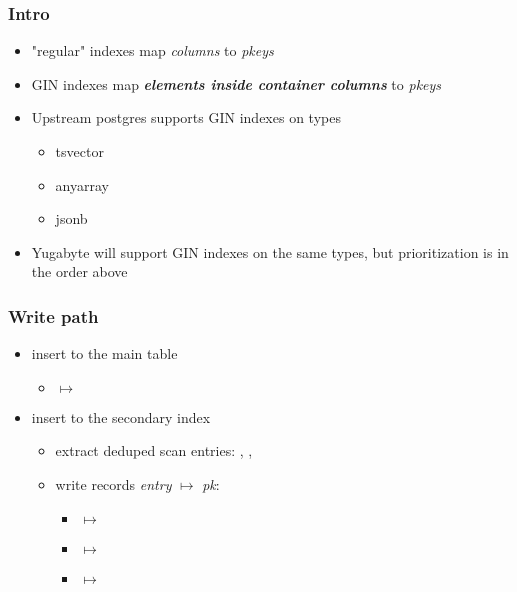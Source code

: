 \begin{frame}
  \titlepage
  \hypertarget{titlePage}{}
\end{frame}

\begin{frame}
  \frametitle{Intro}
  \begin{itemize}
    \item "regular" indexes map \emph{columns} to \emph{pkeys}
      \pause
    \item GIN indexes map \textbf{\emph{elements inside container columns}} to
      \emph{pkeys}
      \pause
    \item Upstream postgres supports GIN indexes on types
      \begin{itemize}
        \item tsvector
        \item anyarray
        \item jsonb
      \end{itemize}
      \pause
    \item Yugabyte will support GIN indexes on the same types, but
      prioritization is in the order above
  \end{itemize}
\end{frame}

\begin{frame}
  \frametitle{Write path}

  \pause

  \pause

  \begin{itemize}
    \item insert to the main table
      \pause
      \begin{itemize}
        \item {} $\mapsto$ 
      \end{itemize}
      \pause
    \item insert to the secondary index
      \pause
      \begin{itemize}
        \item extract deduped scan entries: , ,
          \pause
        \item write records \emph{entry} $\mapsto$ \emph{pk}:
          \pause
          \begin{itemize}
            \item {} $\mapsto$ 
              \pause
            \item {} $\mapsto$ 
              \pause
            \item {} $\mapsto$ 
          \end{itemize}
      \end{itemize}
  \end{itemize}
\end{frame}

